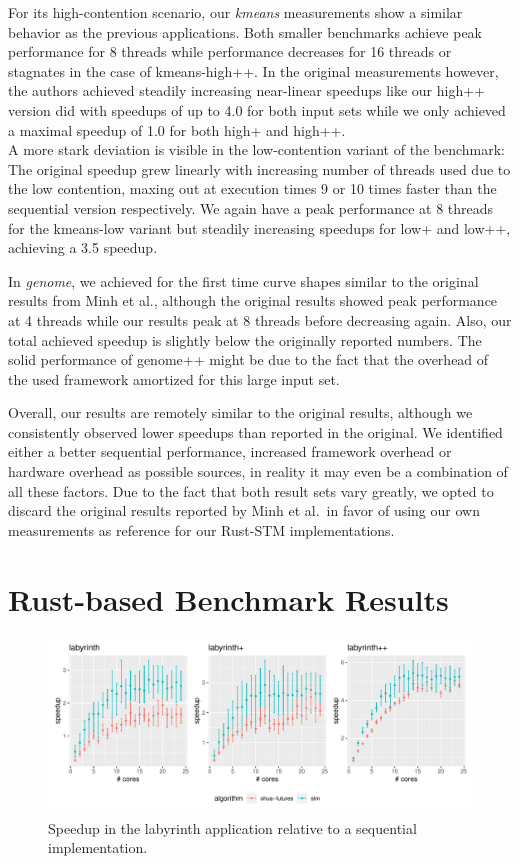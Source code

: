 For its high-contention scenario, our \emph{kmeans} measurements show a similar behavior as the previous applications.
Both smaller benchmarks achieve peak performance for 8 threads while performance decreases for 16 threads or stagnates in the case of kmeans-high++.
In the original measurements however, the authors achieved steadily increasing near-linear speedups like our high++ version did with speedups of up to 4.0 for both input sets while we only achieved a maximal speedup of 1.0 for both high+ and high++.\\
A more stark deviation is visible in the low-contention variant of the benchmark:
The original speedup grew linearly with increasing number of threads used due to the low contention, maxing out at execution times 9 or 10 times faster than the sequential version respectively.
We again have a peak performance at 8 threads for the kmeans-low variant but steadily increasing speedups for low+ and low++, achieving a 3.5 speedup.

In \emph{genome}, we achieved for the first time curve shapes similar to the original results from Minh et al., although the original results showed peak performance at 4 threads while our results peak at 8 threads before decreasing again.
Also, our total achieved speedup is slightly below the originally reported numbers.
The solid performance of genome++ might be due to the fact that the overhead of the used framework amortized for this large input set.

Overall, our results are remotely similar to the original results, although we consistently observed lower speedups than reported in the original.
We identified either a better sequential performance, increased framework overhead or hardware overhead as possible sources, in reality it may even be a combination of all these factors.
Due to the fact that both result sets vary greatly, we opted to discard the original results reported by Minh et al.\ in favor of using our own measurements as reference for our Rust-STM implementations.


\section{Rust-based Benchmark Results}%
\label{sec:evaluation:benchmarks}

\begin{figure}
    \centering
    \includegraphics[width=\textwidth,keepaspectratio]{gfx/results/labyrinth_comb}
    \caption{Speedup in the labyrinth application relative to a sequential implementation.}%
    \label{fig:evaluation:labyrinth}
\end{figure}

